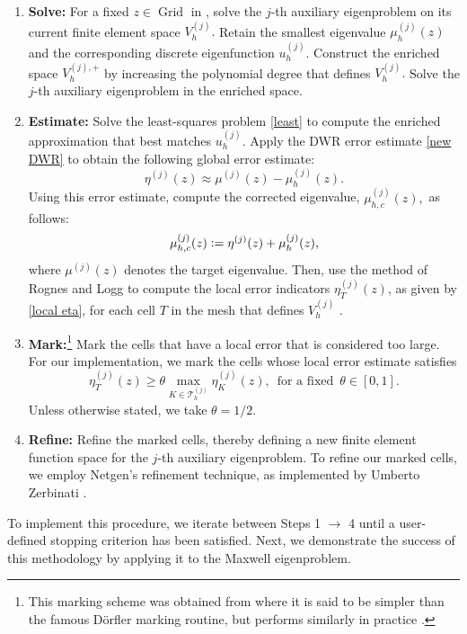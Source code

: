 \begin{enumerate}[label=\textbf{\arabic*}.] 
\setlength{\itemsep}{-0.05\baselineskip}
    \item \textbf{Solve:} For a fixed $z \in \operatorname{Grid}$ in ,
    solve the $j$-th auxiliary eigenproblem on its current finite element space $V_h^{(j)}.$ Retain the smallest eigenvalue $\mu_h^{(j)}(z)$ and the corresponding discrete eigenfunction $u_h^{(j)}.$ Construct the enriched space $V_h^{(j), +}$ by increasing the polynomial degree that defines $V_h^{(j)}.$ Solve the $j$-th auxiliary eigenproblem in the enriched space.
    
    \item \textbf{Estimate:} Solve the least-squares problem \eqref{least} to compute the enriched approximation that best matches $u_h^{(j)}.$ Apply the DWR error estimate \eqref{new DWR} to obtain the following global error estimate:
    \begin{equation}
        \eta^{(j)}(z) \approx  \mu^{(j)}(z) - \mu_h^{(j)}(z).
    \end{equation}
    Using this error estimate, compute the corrected eigenvalue, $\mu_{h,c}^{(j)}(z),$  as follows:
    \begin{equation}
        \mu_{h,c}^{(j)}(z) \vcentcolon= \eta^{(j)}(z) + \mu_h^{(j)}(z),
    \end{equation}
    where $\mu^{(j)}(z)$ denotes the target eigenvalue. 
   Then, use the method of Rognes and Logg to compute the local error indicators $\eta_T^{(j)}(z)$, as given by \eqref{local eta}, for each cell $T$ in the mesh that defines $V_h^{(j)}$ \cite{logg, joe, pablo}. 

    
    \item \textbf{Mark:}\footnote{This marking scheme was obtained from \cite{Pslides} where it is said to be simpler than the famous Dörfler marking routine, but performs similarly in practice \cite{Dorf}.} 
    Mark the cells that have a local error that is considered too large. For our implementation, we mark the cells whose local error estimate satisfies
    \begin{equation} \label{mark}
        \eta_T^{(j)}(z) \ge \theta \max_{K \in \mathcal{T}_h^{(j)}} \eta_K^{(j)}(z), \, \text{ for a fixed } \, \theta \in [0,1].
    \end{equation}
    Unless otherwise stated, we take $\theta = 1/2.$

    
    \item \textbf{Refine:} Refine the marked cells, thereby defining a new finite element function space for the $j$-th auxiliary eigenproblem. To refine our marked cells, we employ Netgen's refinement technique, as implemented by Umberto Zerbinati \cite{NGSolve, Schoberl1997, pablo}.

\end{enumerate}
To implement this procedure, we iterate between Steps 1 $\rightarrow$ 4 until a user-defined stopping criterion has been satisfied. Next, we demonstrate the success of this methodology by applying it to the Maxwell eigenproblem. 
% 


